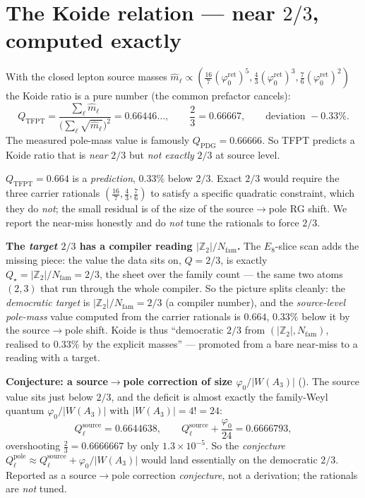 \documentclass[11pt,a4paper]{article}
\newcommand{\phiz}{\varphi_0^{\mathrm{ret}}}
\newcommand{\Nfam}{N_{\mathrm{fam}}}
\newcommand{\Z}{\mathbb{Z}}
\begin{document}
\section{The Koide relation --- near $2/3$, computed exactly}
With the closed lepton source masses $\hat m_\ell\propto(\tfrac{16}{7}(\phiz)^5,\tfrac43(\phiz)^3,\tfrac76(\phiz)^2)$
the Koide ratio is a pure number (the common prefactor cancels):
\[
  Q_{\mathrm{TFPT}}=\frac{\sum_\ell \hat m_\ell}{\bigl(\sum_\ell\sqrt{\hat m_\ell}\bigr)^2}
  =0.66446\ldots,\qquad \frac23=0.66667,\qquad \text{deviation }-0.33\% .
\]
The measured pole-mass value is famously $Q_{\mathrm{PDG}}=0.66666$. So TFPT predicts a Koide ratio that
is \emph{near} $2/3$ but \emph{not exactly} $2/3$ at source level.

\begin{keybox}
$Q_{\mathrm{TFPT}}=0.664$ is a \emph{prediction}, $0.33\%$ below $2/3$. Exact $2/3$ would require the
three carrier rationals $(\tfrac{16}{7},\tfrac43,\tfrac76)$ to satisfy a specific quadratic constraint,
which they do \emph{not}; the small residual is of the size of the source$\to$pole RG shift. We report
the near-miss honestly and do \emph{not} tune the rationals to force $2/3$.
\end{keybox}

\par\smallskip\noindent\textbf{The \emph{target} $2/3$ has a compiler reading $|\Z_2|/\Nfam$.}
The $E_8$-slice scan adds the missing piece: the value the data sits on, $Q=2/3$, is exactly
$Q_\star=|\Z_2|/\Nfam=2/3$,
the sheet over the family count --- the same two atoms $(2,3)$ that run through the whole compiler. So
the picture splits cleanly: the \emph{democratic target} is $|\Z_2|/\Nfam=2/3$ (a compiler number), and
the \emph{source-level pole-mass} value computed from the carrier rationals is $0.664$, $0.33\%$ below it
by the source$\to$pole shift. Koide is thus ``democratic $2/3$ from $(|\Z_2|,\Nfam)$, realised to
$0.33\%$ by the explicit masses'' --- promoted from a bare near-miss to a reading with a target. \mC

\par\smallskip\noindent\textbf{Conjecture: a source$\to$pole correction of size $\varphi_0/|W(A_3)|$} (\mC).
The source value sits just below $2/3$, and the deficit is almost exactly the family-Weyl quantum
$\varphi_0/|W(A_3)|$ with $|W(A_3)|=4!=24$:
\[
  Q_\ell^{\mathrm{source}}=0.6644638,\qquad
  Q_\ell^{\mathrm{source}}+\frac{\varphi_0}{24}=0.6666793,
\]
overshooting $\tfrac23=0.6666667$ by only $1.3\times10^{-5}$. So the \emph{conjecture}
$Q_\ell^{\mathrm{pole}}\approx Q_\ell^{\mathrm{source}}+\varphi_0/|W(A_3)|$ would land essentially on the
democratic $2/3$. Reported as a source$\to$pole correction \emph{conjecture}, not a derivation; the
rationals are \emph{not} tuned. 
\end{document}
